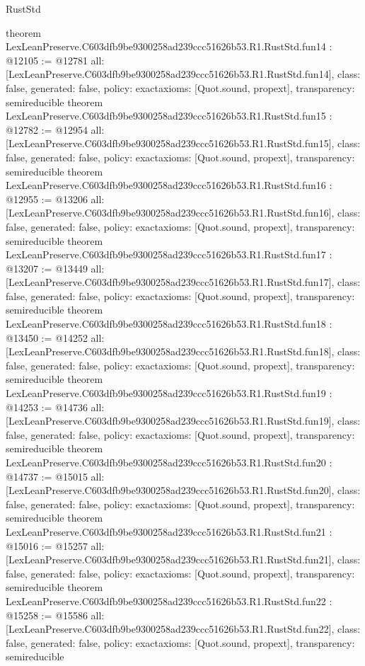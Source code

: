 \begin{lexlean}{RustStd}
\begin{coremodule}
{}
theorem LexLeanPreserve.C603dfb9be9300258ad239ccc51626b53.R1.RustStd.fun14 : @12105 := @12781 {
  all: [LexLeanPreserve.C603dfb9be9300258ad239ccc51626b53.R1.RustStd.fun14],
  class: false,
  generated: false,
  policy: exact{axioms: [Quot.sound, propext]},
  transparency: semireducible
}
theorem LexLeanPreserve.C603dfb9be9300258ad239ccc51626b53.R1.RustStd.fun15 : @12782 := @12954 {
  all: [LexLeanPreserve.C603dfb9be9300258ad239ccc51626b53.R1.RustStd.fun15],
  class: false,
  generated: false,
  policy: exact{axioms: [Quot.sound, propext]},
  transparency: semireducible
}
theorem LexLeanPreserve.C603dfb9be9300258ad239ccc51626b53.R1.RustStd.fun16 : @12955 := @13206 {
  all: [LexLeanPreserve.C603dfb9be9300258ad239ccc51626b53.R1.RustStd.fun16],
  class: false,
  generated: false,
  policy: exact{axioms: [Quot.sound, propext]},
  transparency: semireducible
}
theorem LexLeanPreserve.C603dfb9be9300258ad239ccc51626b53.R1.RustStd.fun17 : @13207 := @13449 {
  all: [LexLeanPreserve.C603dfb9be9300258ad239ccc51626b53.R1.RustStd.fun17],
  class: false,
  generated: false,
  policy: exact{axioms: [Quot.sound, propext]},
  transparency: semireducible
}
theorem LexLeanPreserve.C603dfb9be9300258ad239ccc51626b53.R1.RustStd.fun18 : @13450 := @14252 {
  all: [LexLeanPreserve.C603dfb9be9300258ad239ccc51626b53.R1.RustStd.fun18],
  class: false,
  generated: false,
  policy: exact{axioms: [Quot.sound, propext]},
  transparency: semireducible
}
theorem LexLeanPreserve.C603dfb9be9300258ad239ccc51626b53.R1.RustStd.fun19 : @14253 := @14736 {
  all: [LexLeanPreserve.C603dfb9be9300258ad239ccc51626b53.R1.RustStd.fun19],
  class: false,
  generated: false,
  policy: exact{axioms: [Quot.sound, propext]},
  transparency: semireducible
}
theorem LexLeanPreserve.C603dfb9be9300258ad239ccc51626b53.R1.RustStd.fun20 : @14737 := @15015 {
  all: [LexLeanPreserve.C603dfb9be9300258ad239ccc51626b53.R1.RustStd.fun20],
  class: false,
  generated: false,
  policy: exact{axioms: [Quot.sound, propext]},
  transparency: semireducible
}
theorem LexLeanPreserve.C603dfb9be9300258ad239ccc51626b53.R1.RustStd.fun21 : @15016 := @15257 {
  all: [LexLeanPreserve.C603dfb9be9300258ad239ccc51626b53.R1.RustStd.fun21],
  class: false,
  generated: false,
  policy: exact{axioms: [Quot.sound, propext]},
  transparency: semireducible
}
theorem LexLeanPreserve.C603dfb9be9300258ad239ccc51626b53.R1.RustStd.fun22 : @15258 := @15586 {
  all: [LexLeanPreserve.C603dfb9be9300258ad239ccc51626b53.R1.RustStd.fun22],
  class: false,
  generated: false,
  policy: exact{axioms: [Quot.sound, propext]},
  transparency: semireducible
}
\end{coremodule}
\end{lexlean}
